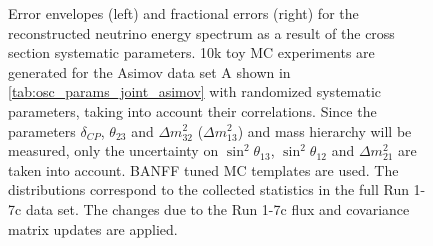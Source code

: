 \begin{figure}[htb]
\caption {
Error envelopes (left) and fractional errors (right) for the reconstructed neutrino energy spectrum
as a result of the cross section systematic parameters. 
10k toy MC experiments are generated for the Asimov data set A shown in \cref{tab:osc_params_joint_asimov}
with randomized systematic parameters, taking into account their correlations.
Since the parameters $\delta_{CP}$, $\theta_{23}$ and $\Delta m^2_{32}$ ($\Delta m^2_{13}$) and mass hierarchy
will be measured,
only the uncertainty on 
$\sin^2 \theta_{13}$,
$\sin^2 \theta_{12}$
and 
$\Delta m^2_{21}$ 
are taken into account.
BANFF tuned MC templates are used. 
The distributions correspond to the collected statistics in the full Run 1-7c data set.
The changes due to the Run 1-7c flux and covariance matrix updates are applied.
}
\label{fig:xsec_envelope_Asimov_A_run17c}
\end{figure}


